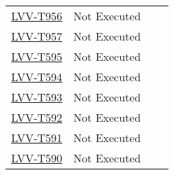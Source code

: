 \documentclass[DM,lsstdraft,STR,toc]{lsstdoc}
\begin{document}
\begin{longtable}{p{2cm}p{2.5cm}p{9cm}p{2.5cm}}
\begin{minipage}[]{9cm}
    \medskip
    \end{minipage}
    &
    \\\hline
\href{https://jira.lsstcorp.org/secure/Tests.jspa#/testCase/LVV-T956}{LVV-T956}
    & Not Executed &
    \begin{minipage}[]{9cm}
    \smallskip
    
    \medskip
    \end{minipage}
    &
    \\\hline
\href{https://jira.lsstcorp.org/secure/Tests.jspa#/testCase/LVV-T957}{LVV-T957}
    & Not Executed &
    \begin{minipage}[]{9cm}
    \smallskip
    
    \medskip
    \end{minipage}
    &
    \\\hline
\href{https://jira.lsstcorp.org/secure/Tests.jspa#/testCase/LVV-T595}{LVV-T595}
    & Not Executed &
    \begin{minipage}[]{9cm}
    \smallskip
    
    \medskip
    \end{minipage}
    &
    \\\hline
\href{https://jira.lsstcorp.org/secure/Tests.jspa#/testCase/LVV-T594}{LVV-T594}
    & Not Executed &
    \begin{minipage}[]{9cm}
    \smallskip
    
    \medskip
    \end{minipage}
    &
    \\\hline
\href{https://jira.lsstcorp.org/secure/Tests.jspa#/testCase/LVV-T593}{LVV-T593}
    & Not Executed &
    \begin{minipage}[]{9cm}
    \smallskip
    
    \medskip
    \end{minipage}
    &
    \\\hline
\href{https://jira.lsstcorp.org/secure/Tests.jspa#/testCase/LVV-T592}{LVV-T592}
    & Not Executed &
    \begin{minipage}[]{9cm}
    \smallskip
    
    \medskip
    \end{minipage}
    &
    \\\hline
\href{https://jira.lsstcorp.org/secure/Tests.jspa#/testCase/LVV-T591}{LVV-T591}
    & Not Executed &
    \begin{minipage}[]{9cm}
    \smallskip
    
    \medskip
    \end{minipage}
    &
    \\\hline
\href{https://jira.lsstcorp.org/secure/Tests.jspa#/testCase/LVV-T590}{LVV-T590}
    & Not Executed &
    \begin{minipage}[]{9cm}
    \smallskip
    

\end{minipage}
\end{longtable}
\end{document}
